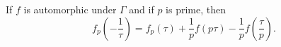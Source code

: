 If $f$ is automorphic under $\Gamma$ and if $p$ is prime, then
$$f_p\left(-\frac{1}{\tau}\right) = f_p(\tau) + \frac{1}{p} f(p\tau) - \frac{1}{p} f\left(\frac{\tau}{p}\right).$$
